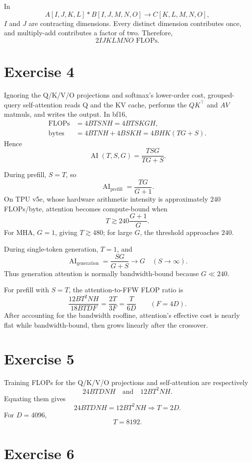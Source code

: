 \documentclass[11pt]{article}
\newcommand{\AI}{\operatorname{AI}}
\begin{document}
In
\[
A[I,J,K,L] * B[I,J,M,N,O] \longrightarrow C[K,L,M,N,O],
\]
$I$ and $J$ are contracting dimensions. Every distinct dimension contributes
once, and multiply-add contributes a factor of two. Therefore,
\[
\boxed{2IJKLMNO\text{ FLOPs}}.
\]

\section*{Exercise 4}

Ignoring the Q/K/V/O projections and softmax's lower-order cost, grouped-query
self-attention reads Q and the KV cache, performs the $QK^\top$ and $AV$
matmuls, and writes the output. In bf16,
\begin{align*}
\text{FLOPs} &= 4BTSNH=4BTSKGH,\\
\text{bytes} &=4BTNH+4BSKH=4BHK(TG+S).
\end{align*}
Hence
\[
\boxed{\AI(T,S,G)=\frac{TSG}{TG+S}}.
\]

During prefill, $S=T$, so
\[
\AI_{\mathrm{prefill}}=\frac{TG}{G+1}.
\]
On TPU v5e, whose hardware arithmetic intensity is approximately
$240$ FLOPs/byte, attention becomes compute-bound when
\[
T\gtrsim 240\frac{G+1}{G}.
\]
For MHA, $G=1$, giving $T\gtrsim480$; for large $G$, the threshold approaches
$240$.

During single-token generation, $T=1$, and
\[
\AI_{\mathrm{generation}}=\frac{SG}{G+S}\longrightarrow G
\quad(S\to\infty).
\]
Thus generation attention is normally bandwidth-bound because $G\ll240$.

For prefill with $S=T$, the attention-to-FFW FLOP ratio is
\[
\frac{12BT^2NH}{18BTDF}
=\frac{2T}{3F}
=\frac{T}{6D}\qquad(F=4D).
\]
After accounting for the bandwidth roofline, attention's effective cost is
nearly flat while bandwidth-bound, then grows linearly after the crossover.

\section*{Exercise 5}

Training FLOPs for the Q/K/V/O projections and self-attention are respectively
\[
24BTDNH
\quad\text{and}\quad
12BT^2NH.
\]
Equating them gives
\[
24BTDNH=12BT^2NH
\Longrightarrow T=2D.
\]
For $D=4096$,
\[
\boxed{T=8192}.
\]

\section*{Exercise 6}
\end{document}

